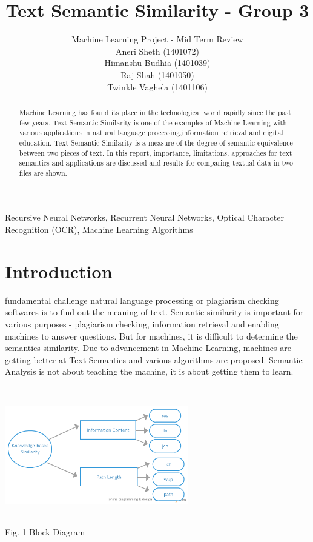 \documentclass[journal, a4paper]{IEEEtran}
\begin{document}
	\title{Text Semantic Similarity - Group 3} 
	\author{Machine Learning Project - Mid Term Review
		\\Aneri Sheth (1401072)\\
		Himanshu Budhia (1401039)\\ Raj Shah (1401050)\\ Twinkle Vaghela (1401106) \\
		\vspace{1cm} }
	\maketitle
\begin{abstract}
Machine Learning has found its place in the technological world rapidly since the past few years. Text Semantic Similarity is one of the examples of Machine Learning with various applications in natural language processing,information retrieval and digital education. Text Semantic Similarity is a measure of the degree of semantic equivalence between two pieces of text. In this report, importance, limitations, approaches for text semantics and applications are discussed and results for comparing textual data in two files are shown. 
\end{abstract}
\begin{IEEEkeywords}
		Recursive Neural Networks, Recurrent Neural Networks, Optical Character Recognition (OCR), Machine Learning Algorithms
	\end{IEEEkeywords}
\section{Introduction}
	 fundamental challenge natural language processing or plagiarism checking softwares is to find out the meaning of text. Semantic similarity is important for various purposes - plagiarism checking, information retrieval and enabling machines to answer questions. But for machines, it is difficult to determine the semantics similarity. Due to advancement in Machine Learning, machines are getting better at Text Semantics and various algorithms are proposed. Semantic Analysis is not about teaching the machine, it is about getting them to learn. \\
	\begin{center}
	\includegraphics[width = 8cm,height = 6cm]{ML.png} \\
	\small Fig. 1 Block Diagram
	\end{center}
	
\end{document}
